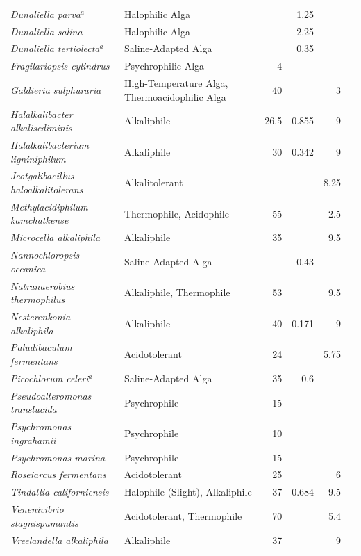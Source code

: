 \begin{tabular}{lp{4.2cm}rrrl}
\textit{Dunaliella parva}$^{a}$ & Halophilic Alga &  & 1.25 &  & \cite{elsheekh2024salinity} \\
\textit{Dunaliella salina} & Halophilic Alga &  & 2.25 &  & \cite{farhat2011optimization} \\
\textit{Dunaliella tertiolecta}$^{a}$ & Saline-Adapted Alga &  & 0.35 &  & \cite{jahnke2003long} \\
\textit{Fragilariopsis cylindrus} & Psychrophilic Alga & 4 &  &  & \cite{mock2017evolutionary} \\
\textit{Galdieria sulphuraria} & High-Temperature Alga, Thermoacidophilic Alga & 40 &  & 3 & \cite{nahlik2021growth} \\
\textit{Halalkalibacter alkalisediminis} & Alkaliphile & 26.5 & 0.855 & 9 & \cite{borsodi2011bacillus} \\
\textit{Halalkalibacterium ligniniphilum} & Alkaliphile & 30 & 0.342 & 9 & \cite{zhu2014bacillus} \\
\textit{Jeotgalibacillus haloalkalitolerans} & Alkalitolerant &  &  & 8.25 & \cite{zhang2024jeotgalibacillus} \\
\textit{Methylacidiphilum kamchatkense} & Thermophile, Acidophile & 55 &  & 2.5 & \cite{ratnadevi2023methylacidiphilum} \\
\textit{Microcella alkaliphila} & Alkaliphile & 35 &  & 9.5 & \cite{tiago2006microcella} \\
\textit{Nannochloropsis oceanica} & Saline-Adapted Alga &  & 0.43 &  & \cite{pan2016utilization} \\
\textit{Natranaerobius thermophilus} & Alkaliphile, Thermophile & 53 &  & 9.5 & \cite{mesbah2007natranaerobius} \\
\textit{Nesterenkonia alkaliphila} & Alkaliphile & 40 & 0.171 & 9 & \cite{zhang2015nesterenkonia} \\
\textit{Paludibaculum fermentans} & Acidotolerant & 24 &  & 5.75 & \cite{kulichevskaya2014paludibaculum} \\
\textit{Picochlorum celeri}$^{a}$ & Saline-Adapted Alga & 35 & 0.6 &  & \cite{krishnan2021picochlorum} \\
\textit{Pseudoalteromonas translucida} & Psychrophile & 15 &  &  & \cite{corsaro2004influence} \\
\textit{Psychromonas ingrahamii} & Psychrophile & 10 &  &  & \cite{auman2006psychromonas} \\
\textit{Psychromonas marina} & Psychrophile & 15 &  &  & \cite{kawasaki2002psychromonas} \\
\textit{Roseiarcus fermentans} & Acidotolerant & 25 &  & 6 & \cite{kulichevskaya2014descriptions} \\
\textit{Tindallia californiensis} & Halophile (Slight), Alkaliphile & 37 & 0.684 & 9.5 & \cite{pikuta2003tindallia} \\
\textit{Venenivibrio stagnispumantis} & Acidotolerant, Thermophile & 70 &  & 5.4 & \cite{hetzer2008venenivibrio} \\
\textit{Vreelandella alkaliphila} & Alkaliphile & 37 &  & 9 & \cite{romano2006halomonas} \\
\hline
\end{tabular}
